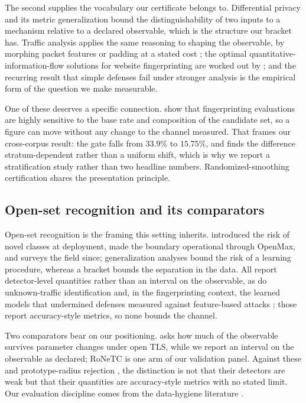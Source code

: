 The second supplies the vocabulary our certificate belongs to. Differential
privacy \citep{dwork2006differential} and its metric generalization
\citep{andres2013geo} bound the distinguishability of two inputs to a mechanism
relative to a declared observable, which is the structure our bracket has. Traffic
analysis applies the same reasoning to shaping the observable, by morphing packet
features \citep{wright2009traffic} or padding at a stated cost
\citep{cai2014systematic}; the optimal quantitative-information-flow solutions
for website fingerprinting are worked out by \citep{athanasiou2025selfdefense};
and the recurring result that simple defenses fail under stronger analysis
\citep{dyer2012peekaboo} is the empirical form of the question we make
measurable.

One of these deserves a specific connection. \citet{juarez2014critical} show
that fingerprinting evaluations are highly sensitive to the base rate and
composition of the candidate set, so a figure can move without any change to the
channel measured. That frames our cross-corpus result: the gate falls from
$33.9\%$ to $15.75\%$, and  finds the difference
stratum-dependent rather than a uniform shift, which is why we report a
stratification study rather than two headline numbers. Randomized-smoothing
certification \citep{cohen2019certified} shares the presentation principle.

\subsection{Open-set recognition and its comparators}
\label{sec:related/openset}

Open-set recognition is the framing this setting inherits.
\citet{scheirer2013toward} introduced the risk of novel classes at deployment,
\citet{bendale2016towards} made the boundary operational through OpenMax, and
\citet{geng2021recent} surveys the field since; generalization analyses
\citep{fang2021learning,garov2025closer} bound the risk of a learning procedure,
whereas a bracket bounds the separation in the data. All report detector-level
quantities rather than an interval on the observable, as do unknown-traffic
identification \citep{hu2022opencbd,li2023facing} and, in the fingerprinting
context, the learned models that undermined defenses measured against
feature-based attacks \citep{sirinam2018deep,rimmer2018automated}; those report
accuracy-style metrics, so none bounds the channel.

Two comparators bear on our positioning.
\citet{shamsimukhametov2023indistinguishability} asks how much of the observable
survives parameter changes under open TLS, while we report an interval on the
observable as declared; RoNeTC \citep{wang2025reliable} is one arm of our
validation panel. Against these and prototype-radius rejection
\citep{qu2026sepspace}, the distinction is not that their detectors are weak but
that their quantities are accuracy-style metrics with no stated limit. Our
evaluation discipline comes from the data-hygiene literature
\citep{zhao2025sweet,wang2026bias,wickramasinghe2025sok,zhao2026shortcutcatcher}.

